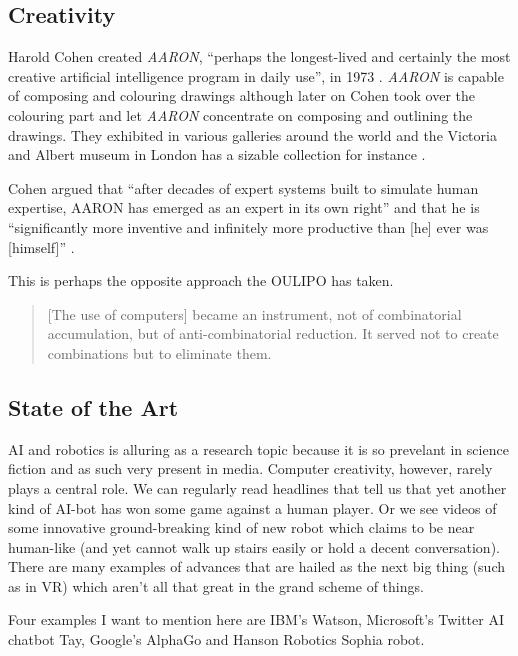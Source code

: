\subsection{Creativity}

Harold Cohen created \textit{AARON}, ``perhaps the longest-lived and certainly the most creative artificial intelligence program in daily use'', in 1973 \autocite{Cohen2016}. \textit{AARON} is capable of composing and colouring drawings although later on Cohen took over the colouring part and let \textit{AARON} concentrate on composing and outlining the drawings. They exhibited in various galleries around the world and the Victoria and Albert museum in London has a sizable collection for instance \autocite{VA2016}.

Cohen argued that ``after decades of expert systems built to simulate human expertise, AARON has emerged as an expert in its own right'' and that he is ``significantly more inventive and infinitely more productive than [he] ever was [himself]'' \autocite*{Cohen2007}.

This is perhaps the opposite approach the \ac{OULIPO} has taken.

\begin{quotation}
  [The use of computers] became an instrument, not of combinatorial accumulation, but of anti-combinatorial reduction. It served not to create combinations but to eliminate them. 
\end{quotation}


\subsection{State of the Art}

\ac{AI} and robotics is alluring as a research topic because it is so prevelant in science fiction and as such very present in media. Computer creativity, however, rarely plays a central role. We can regularly read headlines that tell us that yet another kind of \ac{AI}-bot has won some game against a human player. Or we see videos of some innovative ground-breaking kind of new robot which claims to be near human-like (and yet cannot walk up stairs easily or hold a decent conversation). There are many examples of advances that are hailed as the next big thing (such as in \ac{VR}) which aren't all that great in the grand scheme of things. 

Four examples I want to mention here are IBM's Watson, Microsoft's Twitter \ac{AI} chatbot Tay, Google's AlphaGo and Hanson Robotics Sophia robot.

